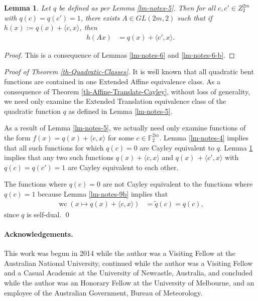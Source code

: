 \documentclass[12pt,a4paper]{article}
\newcommand{\mb}[1]{\mathbb{#1}}
\newcommand{\F}{\mb{F}}
\newcommand{\dual}[1]{\widetilde{#1}}
\newcommand{\weightclass}[1]{\operatorname{wc}\left(#1\right)}
\newtheorem{Lemma}{Lemma}
\newenvironment{proofof}[1]{\noindent\emph{Proof of #1.}}{\qed}
\begin{document}
\begin{Lemma}
\label{lm-notes-7}
Let $q$ be defined as per Lemma \ref{lm-notes-5}.
Then for all $c, c' \in Z_2^{2 m}$ with $q(c)=q(c')=1$, there exists $A \in GL(2 m, 2)$ such that
if $h(x) := q(x) + \langle c, x \rangle$, then
\begin{align*}
h(A x) &= q(x) + \langle c', x \rangle.
\end{align*}
\end{Lemma}

\begin{proof}
This is a consequence of Lemmas \ref{lm-notes-6} and \ref{lm-notes-6-b}.
\end{proof}

\begin{proofof}{Theorem \ref{th-Quadratic-Classes}}
It is well known that all quadratic bent functions are contained in one Extended Affine equivalence
class.
As a consequence of Theorem \ref{th-Affine-Translate-Cayley}, without loss of generality, we need
only examine
the Extended Translation equivalence class of the quadratic function $q$ as defined in Lemma
\ref{lm-notes-5}.

As a result of Lemma \ref{lm-notes-5}, we actually need only examine functions of the form
$f(x) = q(x) + \langle c,x \rangle$
for some $c \in \F_2^{2m}$.
Lemma \ref{lm-notes-4} implies that all such functions for which $q(c)=0$ are Cayley equivalent to
$q$.
Lemma \ref{lm-notes-7} implies that any two such functions $q(x) + \langle c, x \rangle$ and $q(x)\, +
\langle c', x \rangle$
with $q(c)=q(c')=1$ are Cayley equivalent to each other.

The functions where $q(c)=0$ are not Cayley equivalent to the functions where $q(c)=1$ because
Lemma \ref{lm-notes-9b} implies that
\begin{align*}
\weightclass{x \mapsto q(x) + \langle c,x \rangle}
&=
\dual{q}(c) = q(c),
\end{align*}
since $q$ is self-dual.
\end{proofof}

\paragraph*{Acknowledgements.}

This work was begun in 2014 while the author was a Visiting Fellow at the Australian National University,
continued while the author was a Visiting Fellow and a Casual Academic at the University of Newcastle, Australia,
and concluded while the author was an Honorary Fellow at the University of Melbourne,
and an employee of the Australian Government, Bureau of Meteorology.
\end{document}

